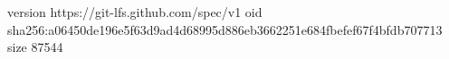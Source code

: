 version https://git-lfs.github.com/spec/v1
oid sha256:a06450de196e5f63d9ad4d68995d886eb3662251e684fbefef67f4bfdb707713
size 87544
